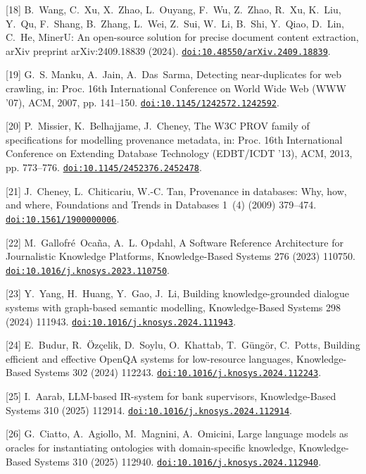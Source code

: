 [18] B.~Wang, C.~Xu, X.~Zhao, L.~Ouyang, F.~Wu, Z.~Zhao, R.~Xu, K.~Liu, Y.~Qu, F.~Shang, B.~Zhang, L.~Wei, Z.~Sui, W.~Li, B.~Shi, Y.~Qiao, D.~Lin, C.~He, {MinerU}: An open-source solution for precise document content extraction, arXiv preprint arXiv:2409.18839 (2024). \href {https://doi.org/10.48550/arXiv.2409.18839} {\texttt{doi:10.48550/arXiv.2409.18839}}.

[19] G.~S. Manku, A.~Jain, A.~Das~Sarma, Detecting near-duplicates for web crawling, in: Proc. 16th International Conference on World Wide Web (WWW '07), ACM, 2007, pp. 141--150. \href {https://doi.org/10.1145/1242572.1242592} {\texttt{doi:10.1145/1242572.1242592}}.

[20] P.~Missier, K.~Belhajjame, J.~Cheney, The {W3C} {PROV} family of specifications for modelling provenance metadata, in: Proc. 16th International Conference on Extending Database Technology (EDBT/ICDT '13), ACM, 2013, pp. 773--776. \href {https://doi.org/10.1145/2452376.2452478} {\texttt{doi:10.1145/2452376.2452478}}.

[21] J.~Cheney, L.~Chiticariu, W.-C. Tan, Provenance in databases: Why, how, and where, Foundations and Trends in Databases 1~(4) (2009) 379--474. \href {https://doi.org/10.1561/1900000006} {\texttt{doi:10.1561/1900000006}}.

[22] M.~Gallofr{\'e}~Oca{\~n}a, A.~L. Opdahl, {A Software Reference Architecture for Journalistic Knowledge Platforms}, Knowledge-Based Systems 276 (2023) 110750. \href {https://doi.org/10.1016/j.knosys.2023.110750} {\texttt{doi:10.1016/j.knosys.2023.110750}}.

[23] Y.~Yang, H.~Huang, Y.~Gao, J.~Li, {Building knowledge-grounded dialogue systems with graph-based semantic modelling}, Knowledge-Based Systems 298 (2024) 111943. \href {https://doi.org/10.1016/j.knosys.2024.111943} {\texttt{doi:10.1016/j.knosys.2024.111943}}.

[24] E.~Budur, R.~{\"O}z{\c{c}}elik, D.~Soylu, O.~Khattab, T.~G{\"u}ng{\"o}r, C.~Potts, {Building efficient and effective OpenQA systems for low-resource languages}, Knowledge-Based Systems 302 (2024) 112243. \href {https://doi.org/10.1016/j.knosys.2024.112243} {\texttt{doi:10.1016/j.knosys.2024.112243}}.

[25] I.~Aarab, {LLM-based IR-system for bank supervisors}, Knowledge-Based Systems 310 (2025) 112914. \href {https://doi.org/10.1016/j.knosys.2024.112914} {\texttt{doi:10.1016/j.knosys.2024.112914}}.

[26] G.~Ciatto, A.~Agiollo, M.~Magnini, A.~Omicini, {Large language models as oracles for instantiating ontologies with domain-specific knowledge}, Knowledge-Based Systems 310 (2025) 112940. \href {https://doi.org/10.1016/j.knosys.2024.112940} {\texttt{doi:10.1016/j.knosys.2024.112940}}.

